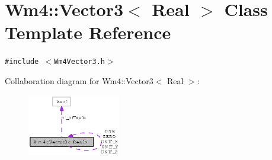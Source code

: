 \section{Wm4::Vector3$<$ Real $>$ Class Template Reference}
\label{classWm4_1_1Vector3}
{\tt \#include $<$Wm4Vector3.h$>$}

Collaboration diagram for Wm4::Vector3$<$ Real $>$:\begin{figure}[H]
\begin{center}
\leavevmode
\includegraphics[width=115pt]{classWm4_1_1Vector3__coll__graph}
\end{center}
\end{figure}
